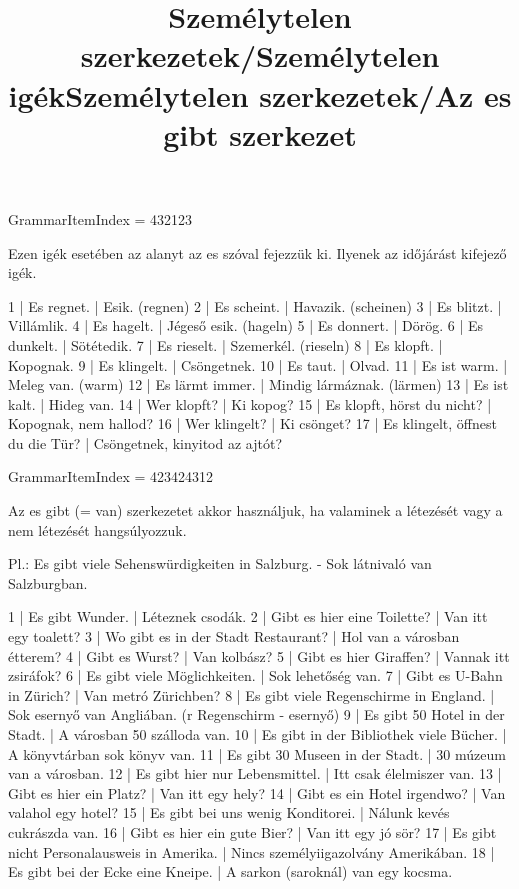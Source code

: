 \title{Személytelen szerkezetek/Személytelen igék}

GrammarItemIndex = 432123

\begin{desc}
Ezen igék esetében az alanyt az es szóval fejezzük ki. Ilyenek az időjárást kifejező igék.
\end{desc}

\begin{exmp}
1 | Es regnet. | Esik. (regnen)
2 | Es scheint. | Havazik. (scheinen)
3 | Es blitzt. | Villámlik.
4 | Es hagelt. | Jégeső esik. (hageln)
5 | Es donnert. | Dörög.
6 | Es dunkelt. | Sötétedik.
7 | Es rieselt. | Szemerkél. (rieseln)
8 | Es klopft. | Kopognak.
9 | Es klingelt. | Csöngetnek.
10 | Es taut. | Olvad.
11 | Es ist warm. | Meleg van. (warm)
12 | Es lärmt immer. | Mindig lármáznak. (lärmen)
13 | Es ist kalt. | Hideg van.
14 | Wer klopft? | Ki kopog?
15 | Es klopft, hörst du nicht? | Kopognak, nem hallod?
16 | Wer klingelt? | Ki csönget?
17 | Es klingelt, öffnest du die Tür? | Csöngetnek, kinyitod az ajtót?
\end{exmp}

\title{Személytelen szerkezetek/Az es gibt szerkezet}

GrammarItemIndex = 423424312

\begin{desc}
Az es gibt (= van) szerkezetet akkor használjuk, ha valaminek a létezését vagy a nem létezését hangsúlyozzuk.

Pl.: Es gibt viele Sehenswürdigkeiten in Salzburg. - Sok látnivaló van Salzburgban.
\end{desc}

\begin{exmp}
1 | Es gibt Wunder. | Léteznek csodák.
2 | Gibt es hier eine Toilette? | Van itt egy toalett?
3 | Wo gibt es in der Stadt Restaurant? | Hol van a városban étterem?
4 | Gibt es Wurst? | Van kolbász?
5 | Gibt es hier Giraffen? | Vannak itt zsiráfok?
6 | Es gibt viele Möglichkeiten. | Sok lehetőség van.
7 | Gibt es U-Bahn in Zürich? | Van metró Zürichben?
8 | Es gibt viele Regenschirme in England. | Sok esernyő van Angliában. (r Regenschirm - esernyő)
9 | Es gibt 50 Hotel in der Stadt. | A városban 50 szálloda van.
10 | Es gibt in der Bibliothek viele Bücher. | A könyvtárban sok könyv van.
11 | Es gibt 30 Museen in der Stadt. | 30 múzeum van a városban.
12 | Es gibt hier nur Lebensmittel. | Itt csak élelmiszer van.
13 | Gibt es hier ein Platz? | Van itt egy hely?
14 | Gibt es ein Hotel irgendwo? | Van valahol egy hotel?
15 | Es gibt bei uns wenig Konditorei. | Nálunk kevés cukrászda van.
16 | Gibt es hier ein gute Bier? | Van itt egy jó sör?
17 | Es gibt nicht Personalausweis in Amerika. | Nincs személyiigazolvány Amerikában.
18 | Es gibt bei der Ecke eine Kneipe. | A sarkon (saroknál) van egy kocsma.
\end{exmp}

